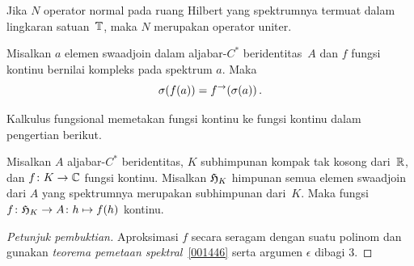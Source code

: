 \begin{exam} Jika $N$ operator normal pada ruang Hilbert yang spektrumnya termuat dalam lingkaran satuan~$\mathbb{T}$,
maka $N$ merupakan operator uniter.
\end{exam}

\begin{prop}\label{001446} Misalkan $a$ elemen swaadjoin
dalam aljabar-$C^*$ beridentitas~$A$ dan $f$ fungsi kontinu bernilai kompleks pada spektrum
$a$. Maka
  \[ \sigma(f(a)) = f^{\rightarrow}(\sigma(a))\,. \]
\end{prop}

Kalkulus fungsional memetakan fungsi kontinu ke fungsi kontinu dalam pengertian berikut.

\begin{prop}\label{001449} Misalkan $A$ aljabar-$C^*$ beridentitas, $K$ subhimpunan kompak tak kosong dari~$\mathbb{R}$,
dan $f\colon K \rightarrow \mathbb{C}$ fungsi kontinu. Misalkan $\mathfrak{H}_K$ himpunan semua elemen swaadjoin dari $A$ yang spektrumnya
merupakan subhimpunan dari~$K$. Maka fungsi $f\colon \mathfrak{H}_K \rightarrow A\colon h \mapsto f(h)$ kontinu.
\end{prop}

\begin{proof}[\emph{Petunjuk pembuktian}] Aproksimasi $f$ secara seragam dengan suatu polinom dan gunakan
\emph{teorema pemetaan spektral}~\ref{001446} serta argumen $\epsilon$ dibagi $3$.   \ns
\end{proof}













\endinput
